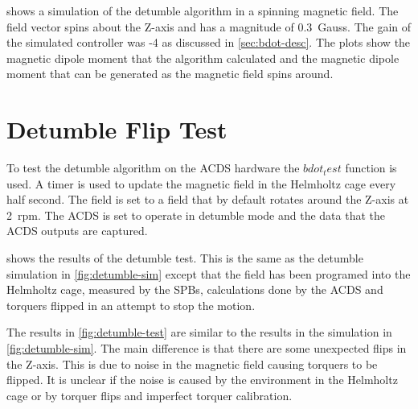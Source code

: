  shows a simulation of the detumble algorithm in a spinning magnetic field. The field vector spins about the Z-axis and has a magnitude of 0.3~Gauss. The gain of the simulated controller was -4 as discussed in \cref{sec:bdot-desc}. The plots show the magnetic dipole moment that the algorithm calculated and the magnetic dipole moment that can be generated as the magnetic field spins around.


\section{Detumble Flip Test}

To test the detumble algorithm on the \ac{ACDS} hardware the \lstMat$bdot_test$ function is used. A timer is used to update the magnetic field in the Helmholtz cage every half second. The field is set to a field that by default rotates around the Z-axis at 2~rpm. The \ac{ACDS} is set to operate in detumble mode and the data that the \ac{ACDS} outputs are captured.


 shows the results of the detumble test. This is the same as the detumble simulation in \cref{fig:detumble-sim} except that the field has been programed into the Helmholtz cage, measured by the \acp{SPB}, calculations done by the \ac{ACDS} and torquers flipped in an attempt to stop the motion.

The results in \cref{fig:detumble-test} are similar to the results in the simulation in \cref{fig:detumble-sim}. The main difference is that there are some unexpected flips in the Z-axis. This is due to noise in the magnetic field causing torquers to be flipped. It is unclear if the noise is caused by the environment in the Helmholtz cage or by torquer flips and imperfect torquer calibration.


